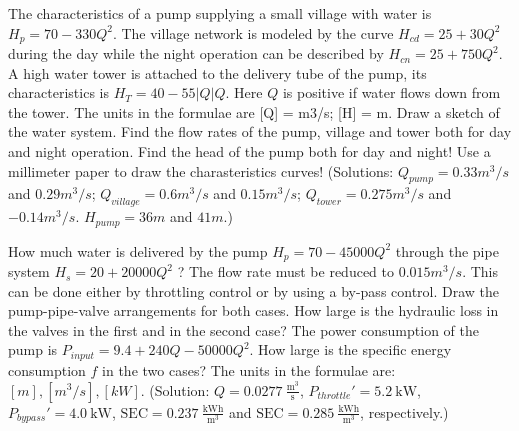 
\vspace{1cm}

The characteristics of a pump supplying a small village with water is $H_p=70-330Q^2$. The village network is modeled by the curve $H_{cd}=25+30Q^2$ during the day while the night operation can be described by $H_{cn}=25+750Q^2$. A high water tower is attached to the delivery tube of the pump, its characteristics is $H_T=40-55|Q|Q $. Here $Q$ is positive if water flows down from the tower. The units in the formulae are [Q] = m3/s; [H] = m. Draw a sketch of the water system. Find the flow rates of the pump, village and tower both for day and night operation. Find the head of the pump both for day and night! Use a millimeter paper to draw the charasteristics curves! (Solutions: $Q_{pump}=0.33m^3/s$ and $0.29m^3/s$; $Q_{village}=0.6m^3/s$ and $0.15m^3/s$; $Q_{tower}=0.275m^3/s$ and $-0.14m^3/s$. $H_{pump}=36m$ and $41m$.)

\vspace{1cm}

How much water is delivered by the pump $H_p=70-45000Q^2$ through the pipe system $H_s = 20+20000Q^2$ ? The flow rate must be reduced to $0.015 m^3/s$. This can be done either by throttling control or by using a by-pass control. Draw the pump-pipe-valve arrangements for both cases. How large is the hydraulic loss in the valves in the first and in the second case? The power consumption of the pump is $P_{input} = 9.4+240Q-50000Q^2$. How large is the specific energy consumption $f$ in the two cases? The units in the formulae are: $[m], [m^3/s], [kW]$. (Solution: $Q= 0.0277~\frac{\mathrm{m^3}}{\mathrm{s}}$, $P_{throttle}' = 5.2~\mathrm{kW}$, $P_{bypass}'=4.0~\mathrm{kW}$, $\mathrm{SEC}=0.237~\frac{\mathrm{kWh}}{\mathrm{m^3}}$ and $\mathrm{SEC}=0.285~\frac{\mathrm{kWh}}{\mathrm{m^3}}$, respectively.)

